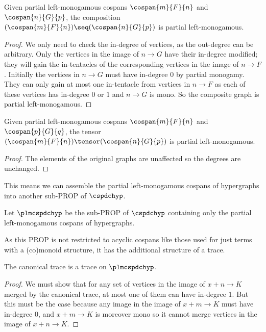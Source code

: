 \begin{lemma}
    Given partial left-monogamous cospans
    \(\cospan{m}{F}{n}\) and
    \(\cospan{n}{G}{p}\), the composition \(
        (\cospan{m}{F}{n})
        \seq
        (\cospan{n}{G}{p})
    \) is partial left-monogamous.
\end{lemma}
\begin{proof}
    We only need to check the in-degree of vertices, as the out-degree can be
    arbitrary.
    Only the vertices in the image of \(n \to G\) have their in-degree modified;
    they will gain the in-tentacles of the corresponding vertices in the image
    of \(n \to F\).
    Initially the vertices in \(n \to G\) must have in-degree \(0\) by partial
    monogamy.
    They can only gain at most one in-tentacle from vertices in \(n \to F\)
    as each of these vertices has in-degree \(0\) or \(1\) and \(n \to G\) is
    mono.
    So the composite graph is partial left-monogamous.
\end{proof}

\begin{lemma}
    Given partial left-monogamous cospans \(\cospan{m}{F}{n}\)
    and \(\cospan{p}{G}{q}\), the tensor \(
        (\cospan{m}{F}{n})
        \tensor
        (\cospan{n}{G}{p})
    \) is partial left-monogamous.
\end{lemma}
\begin{proof}
    The elements of the original graphs are unaffected so
    the degrees are unchanged.
\end{proof}

This means we can assemble the partial left-monogamous cospans of hypergraphs
into another sub-PROP of \(\cspdchyp\).

\begin{definition}
    Let \(\plmcspdchyp\) be the sub-PROP of \(\cspdchyp\) containing only the
    partial left-monogamous cospans of hypergraphs.
\end{definition}

As this PROP is not restricted to acyclic cospans like those used for just
terms with a (co)monoid structure, it has the additional structure of a trace.

\begin{proposition}
    The canonical trace is a trace on \(\plmcspdchyp\).
\end{proposition}
\begin{proof}
    We must show that for any set of vertices in the image
    of \(x + n \to K\) merged by the canonical trace, at most one of them can
    have in-degree \(1\).
    But this must be the case because any image in the image of
    \(x + m \to K\) must have in-degree \(0\), and \(x + m \to K\) is
    moreover mono so it cannot merge vertices in the image of
    \(x + n \to K\).
\end{proof}

